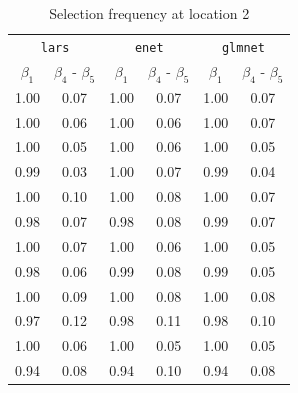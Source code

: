 \documentclass[authoryear, review, 11pt]{elsarticle}
\begin{document}
		\begin{table}[ht]
		\begin{center}
		\begin{tabular}{cc|cc|cc}
		\multicolumn{2}{c}{\texttt{lars}} & \multicolumn{2}{c}{\texttt{enet}} & \multicolumn{2}{c}{\texttt{glmnet}} \\
		 $\beta_1$ & $\beta_4$ - $\beta_5$ & $\beta_1$ & $\beta_4$ - $\beta_5$ & $\beta_1$ & $\beta_4$ - $\beta_5$ \\ 
		  \hline
		1.00 & 0.07 & 1.00 & 0.07 & 1.00 & 0.07 \\ 
		  1.00 & 0.06 & 1.00 & 0.06 & 1.00 & 0.07 \\ 
		  1.00 & 0.05 & 1.00 & 0.06 & 1.00 & 0.05 \\ 
		  0.99 & 0.03 & 1.00 & 0.07 & 0.99 & 0.04 \\ 
		  \hline
		  1.00 & 0.10 & 1.00 & 0.08 & 1.00 & 0.07 \\ 
		  0.98 & 0.07 & 0.98 & 0.08 & 0.99 & 0.07 \\ 
		  1.00 & 0.07 & 1.00 & 0.06 & 1.00 & 0.05 \\ 
		  0.98 & 0.06 & 0.99 & 0.08 & 0.99 & 0.05 \\ 
		  \hline
		  1.00 & 0.09 & 1.00 & 0.08 & 1.00 & 0.08 \\ 
		  0.97 & 0.12 & 0.98 & 0.11 & 0.98 & 0.10 \\ 
		  1.00 & 0.06 & 1.00 & 0.05 & 1.00 & 0.05 \\ 
		  0.94 & 0.08 & 0.94 & 0.10 & 0.94 & 0.08 \\ 
		  \end{tabular}
		\caption{Selection frequency at location 2\label{table:loc2-selection}}
		\end{center}
		\end{table}
\end{document}
